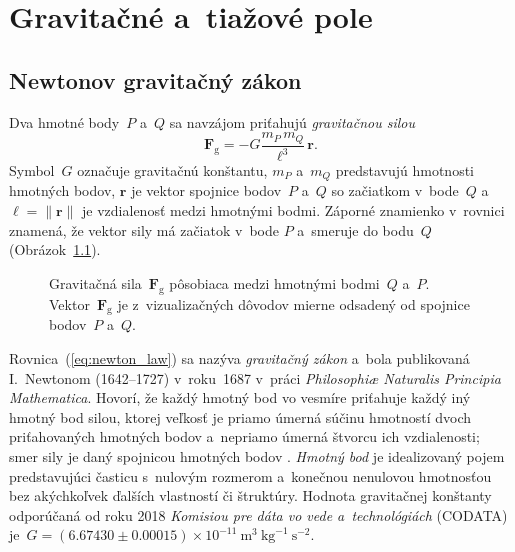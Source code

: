 \documentclass[a4paper, 12pt]{book}
\newcommand{\gidx}{\mathrm g}
\let\vec\mathbf
\begin{document}

\chapter{Gravitačné a~tiažové pole}
\label{sec:gravitational_and_gravity_field}






\section{Newtonov gravitačný zákon}
\label{sec:newton_law}

Dva hmotné body~$P$ a~$Q$ sa navzájom priťahujú \emph{gravitačnou silou}
%
\begin{equation}
\label{eq:newton_law}
\vec F_\gidx = -G \frac{m_P \, m_Q}{\ell^3} \, \vec{r}{.}
\end{equation}
%
Symbol~$G$ označuje gravitačnú konštantu, $m_P$ a~$m_Q$ predstavujú hmotnosti 
hmotných bodov, $\vec r$ je vektor spojnice bodov~$P$ a~$Q$ so začiatkom 
v~bode~$Q$ a~$\ell = \| \vec r \|$ je vzdialenosť medzi hmotnými bodmi.  
Záporné znamienko v~rovnici znamená, že vektor sily má začiatok v~bode $P$ 
a~smeruje do bodu~$Q$ (Obrázok~\ref{fig:newton_law}).

\begin{figure}[b]
\centering

\caption{Gravitačná sila~$\vec F_\gidx$ pôsobiaca medzi hmotnými bodmi~$Q$ 
a~$P$.  Vektor~$\vec F_\gidx$ je z~vizualizačných dôvodov mierne odsadený od 
spojnice bodov~$P$ a~$Q$.}
\label{fig:newton_law}
\end{figure}

Rovnica~(\ref{eq:newton_law}) sa nazýva \emph{gravitačný zákon} a~bola 
publikovaná I.~Newtonom (1642--1727) v~roku~1687 v~práci \emph{Philosophi\ae 
Naturalis Principia Mathematica}.  Hovorí, že každý hmotný bod vo vesmíre 
priťahuje každý iný hmotný bod silou, ktorej veľkosť je priamo úmerná súčinu 
hmotností dvoch priťahovaných hmotných bodov a~nepriamo úmerná štvorcu ich 
vzdialenosti; smer sily je daný spojnicou hmotných bodov 
\parencite{Kellogg1967}.  \emph{Hmotný bod} je idealizovaný pojem predstavujúci 
časticu s~nulovým rozmerom a~konečnou nenulovou hmotnosťou bez akýchkoľvek 
ďalších vlastností či štruktúry.  Hodnota gravitačnej konštanty odporúčaná od 
roku 2018 \emph{Komisiou pre dáta vo vede a~technológiách} (CODATA) je~$G 
= (6.67430 \pm 0.00015) \times 10^{-11} \ \mathrm{m}^3 \ \mathrm{kg}^{-1} 
\ \mathrm{s}^{-2}$.
\end{document}
